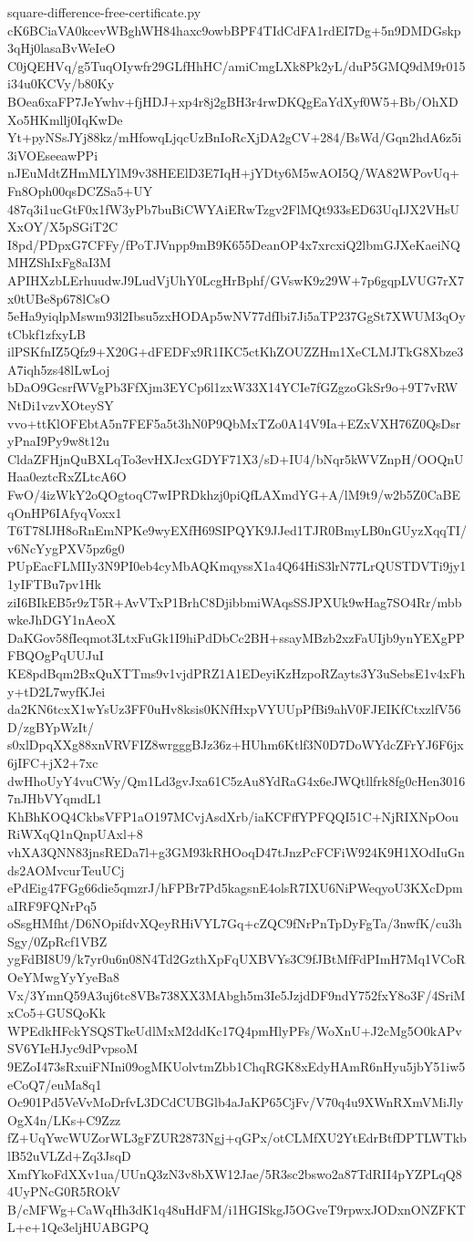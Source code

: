 \documentclass[11pt]{article}
\theoremstyle{definition}
\theoremstyle{remark}
\begin{document}
\begin{filecontents*}[overwrite]{square-difference-free-certificate.py}
cK6BCiaVA0kcevWBghWH84haxc9owbBPF4TIdCdFA1rdEI7Dg+5n9DMDGskp3qHj0lasaBvWeIeO
C0jQEHVq/g5TuqOIywfr29GLfHhHC/amiCmgLXk8Pk2yL/duP5GMQ9dM9r015i34u0KCVy/b80Ky
BOea6xaFP7JeYwhv+fjHDJ+xp4r8j2gBH3r4rwDKQgEaYdXyf0W5+Bb/OhXDXo5HKmllj0IqKwDe
Yt+pyNSsJYj88kz/mHfowqLjqcUzBnIoRcXjDA2gCV+284/BsWd/Gqn2hdA6z5i3iVOEseeawPPi
nJEuMdtZHmMLYlM9v38HEElD3E7IqH+jYDty6M5wAOI5Q/WA82WPovUq+Fn8Oph00qsDCZSa5+UY
487q3i1ucGtF0x1fW3yPb7buBiCWYAiERwTzgv2FlMQt933sED63UqIJX2VHsUXxOY/X5pSGiT2C
I8pd/PDpxG7CFFy/fPoTJVnpp9mB9K655DeanOP4x7xrcxiQ2lbmGJXeKaeiNQMHZShIxFg8aI3M
APIHXzbLErhuudwJ9LudVjUhY0LcgHrBphf/GVswK9z29W+7p6gqpLVUG7rX7x0tUBe8p678lCsO
5eHa9yiqlpMswm93l2Ibsu5zxHODAp5wNV77dfIbi7Ji5aTP237GgSt7XWUM3qOytCbkf1zfxyLB
ilPSKfnIZ5Qfz9+X20G+dFEDFx9R1IKC5ctKhZOUZZHm1XeCLMJTkG8Xbze3A7iqh5zs48lLwLoj
bDaO9GcsrfWVgPb3FfXjm3EYCp6l1zxW33X14YCIe7fGZgzoGkSr9o+9T7vRWNtDi1vzvXOteySY
vvo+ttKlOFEbtA5n7FEF5a5t3hN0P9QbMxTZo0A14V9Ia+EZxVXH76Z0QsDsryPnaI9Py9w8t12u
CldaZFHjnQuBXLqTo3evHXJcxGDYF71X3/sD+IU4/bNqr5kWVZnpH/OOQnUHaa0eztcRxZLtcA6O
FwO/4izWkY2oQOgtoqC7wIPRDkhzj0piQfLAXmdYG+A/lM9t9/w2b5Z0CaBEqOnHP6IAfyqVoxx1
T6T78IJH8oRnEmNPKe9wyEXfH69SIPQYK9JJed1TJR0BmyLB0nGUyzXqqTI/v6NcYygPXV5pz6g0
PUpEacFLMIIy3N9PI0eb4cyMbAQKmqyssX1a4Q64HiS3lrN77LrQUSTDVTi9jy11yIFTBu7pv1Hk
ziI6BIkEB5r9zT5R+AvVTxP1BrhC8DjibbmiWAqsSSJPXUk9wHag7SO4Rr/mbbwkeJhDGY1nAeoX
DaKGov58fIeqmot3LtxFuGk1I9hiPdDbCc2BH+ssayMBzb2xzFaUIjb9ynYEXgPPFBQOgPqUUJuI
KE8pdBqm2BxQuXTTms9v1vjdPRZ1A1EDeyiKzHzpoRZayts3Y3uSebsE1v4xFhy+tD2L7wyfKJei
da2KN6tcxX1wYsUz3FF0uHv8ksis0KNfHxpVYUUpPfBi9ahV0FJEIKfCtxzlfV56D/zgBYpWzIt/
s0xlDpqXXg88xnVRVFIZ8wrgggBJz36z+HUhm6Ktlf3N0D7DoWYdcZFrYJ6F6jx6jIFC+jX2+7xc
dwHhoUyY4vuCWy/Qm1Ld3gvJxa61C5zAu8YdRaG4x6eJWQtllfrk8fg0cHen30167nJHbVYqmdL1
KhBhKOQ4CkbsVFP1aO197MCvjAsdXrb/iaKCFffYPFQQI51C+NjRIXNpOouRiWXqQ1nQnpUAxl+8
vhXA3QNN83jnsREDa7l+g3GM93kRHOoqD47tJnzPcFCFiW924K9H1XOdIuGnds2AOMvcurTeuUCj
ePdEig47FGg66die5qmzrJ/hFPBr7Pd5kagsnE4olsR7IXU6NiPWeqyoU3KXcDpmaIRF9FQNrPq5
oSsgHMfht/D6NOpifdvXQeyRHiVYL7Gq+cZQC9fNrPnTpDyFgTa/3nwfK/cu3hSgy/0ZpRcf1VBZ
ygFdBI8U9/k7yr0u6n08N4Td2GzthXpFqUXBVYs3C9fJBtMfFdPImH7Mq1VCoROeYMwgYyYyeBa8
Vx/3YmnQ59A3uj6tc8VBs738XX3MAbgh5m3Ie5JzjdDF9ndY752fxY8o3F/4SriMxCo5+GUSQoKk
WPEdkHFckYSQSTkeUdlMxM2ddKc17Q4pmHlyPFs/WoXnU+J2cMg5O0kAPvSV6YIeHJyc9dPvpsoM
9EZoI473sRxuiFNIni09ogMKUolvtmZbb1ChqRGK8xEdyHAmR6nHyu5jbY51iw5eCoQ7/euMa8q1
Oc901Pd5VeVvMoDrfvL3DCdCUBGlb4aJaKP65CjFv/V70q4u9XWnRXmVMiJlyOgX4n/LKs+C9Zzz
fZ+UqYwcWUZorWL3gFZUR2873Ngj+qGPx/otCLMfXU2YtEdrBtfDPTLWTkblB52uVLZd+Zq3JsqD
XmfYkoFdXXv1ua/UUnQ3zN3v8bXW12Jae/5R3sc2bswo2a87TdRII4pYZPLqQ84UyPNcG0R5ROkV
B/cMFWg+CaWqHh3dK1q48uHdFM/i1HGISkgJ5OGveT9rpwxJODxnONZFKTL+e+1Qe3eljHUABGPQ

\end{filecontents*}
\end{document}
